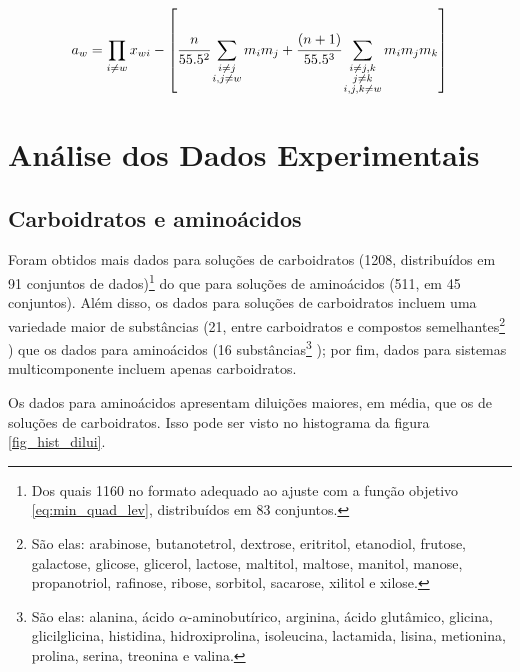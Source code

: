 \documentclass[
	12pt,				%
	openright,
	twoside,
	a4paper,			%
	brazil,			%
	french,				%
	spanish,			%
	english				%
	]{abntex2}
\begin{document}
\begin{equation}
	\label{eq_caurie_raoult}
	a_w = \prod_{i \neq w}x_{wi}-\left[\cfrac{n}%
	{55.5^2}\sum_{\substack{i \neq j \\ i,j \neq w}}%
	m_im_j + \cfrac{(n+1)}{55.5^3}\sum_{%
	\substack{i\neq j,k \\ j \neq k \\  i,j,k \neq w}}%
	m_im_jm_k\right]
\end{equation}

\chapter{Análise dos Dados Experimentais}

\section{Carboidratos e aminoácidos}

Foram obtidos mais dados para soluções de carboidratos (1208, distribuídos em
91 conjuntos de dados)\footnote{%
	Dos quais 1160 no formato adequado ao ajuste com a função objetivo
	\ref{eq:min_quad_lev}, distribuídos em 83 conjuntos.
}
do que para soluções de aminoácidos (511, em 45 conjuntos). Além disso, os dados
para soluções de carboidratos incluem uma variedade maior de substâncias (21,
entre carboidratos e compostos semelhantes\footnote{%
	São elas: arabinose, butanotetrol, dextrose, eritritol, etanodiol,
	frutose, galactose, glicose, glicerol, lactose, maltitol, maltose,
	manitol, manose, propanotriol, rafinose, ribose, sorbitol, sacarose,
	xilitol e xilose.
}
) que os dados para aminoácidos (16 substâncias\footnote{%
	São elas: alanina, ácido $\alpha$-aminobutírico, arginina, ácido
	glutâmico, glicina, glicilglicina, histidina, hidroxiprolina,
	isoleucina, lactamida, lisina, metionina, prolina, serina,
	treonina e valina.
}
); por fim, dados para sistemas multicomponente incluem apenas carboidratos.

Os dados para aminoácidos apresentam diluições maiores, em média, que os de
soluções de carboidratos. Isso pode ser visto no histograma da figura
\ref{fig_hist_dilui}.
\end{document}
